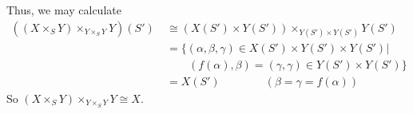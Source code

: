 Thus, we may calculate 
\begin{align*}
 ((X\times_S Y)\times_{Y\times_S Y}Y)(S') \
    &\cong (X(S')\times Y(S'))\times_{Y(S')\times Y(S')}Y(S')\\
    &= \{(\alpha,\beta,\gamma)\in X(S')\times Y(S')\times Y(S')| \\
    &\qquad (f(\alpha),\beta) = (\gamma,\gamma)\in Y(S')\times Y(S')
    \}\\
    &= X(S')\qquad \qquad (\beta=\gamma=f(\alpha))
\end{align*}
So $(X\times_S Y)\times_{Y\times_S Y}Y\cong X$.
